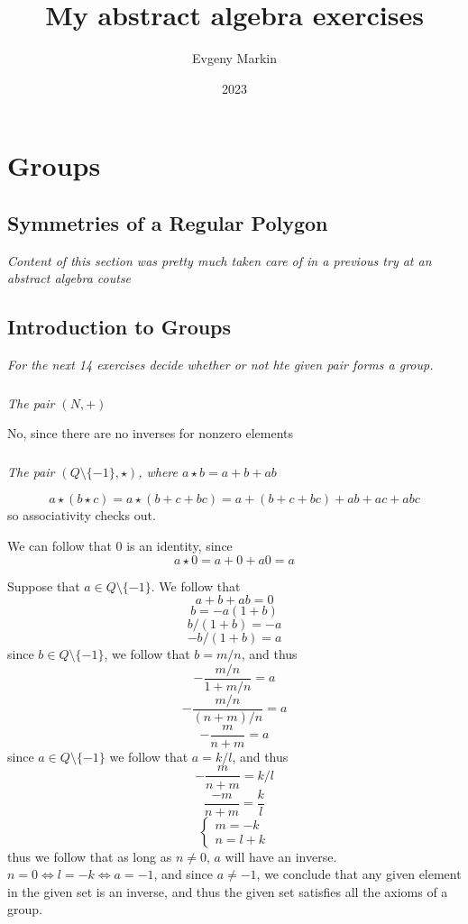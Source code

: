 \documentclass[11pt,oneside,titlepage]{book}
\title{My abstract algebra exercises}
\author{Evgeny Markin}
\date{2023}
\newcommand{\set}[1]{\{ #1 \}}
\begin{document}
\maketitle
\tableofcontents

\chapter{Groups}

\section{Symmetries of  a Regular Polygon}

\textit{Content of this section was pretty much taken care of in a previous try at an
  abstract algebra coutse}

\section{Introduction to Groups}

\textit{For the next 14 exercises decide whether or not hte given pair forms a group.}

\subsection{}

\textit{The pair $(N, +)$}

No, since there are no inverses for nonzero elements

\subsection{}

\textit{The pair $(Q \setminus \set{-1}, \star)$, where $a \star b = a + b + ab$}

$$a \star (b \star c) = a \star (b + c + bc) = a + (b + c + bc) + ab + ac + abc$$
so associativity checks out.

We can follow that $0$ is an identity, since
$$a \star 0 = a + 0 + a0 = a$$

Suppose that $a \in Q \setminus \set{-1}$. We follow that
$$a + b + ab = 0$$
$$b = -a(1 + b)$$
$$b/(1 + b) = -a$$
$$- b/(1 + b) = a$$
since $b \in Q \setminus \set{-1}$, we follow that $b = m/n$, and thus
$$- \frac{m/n}{1 + m/n} = a$$
$$- \frac{m/n}{(n + m)/n} = a$$
$$- \frac{m}{n + m} = a$$
since $a \in Q \setminus \set{-1}$ we follow that $a = k/l$, and thus
$$- \frac{m}{n + m} = k/l$$
$$\frac{- m}{n + m} = \frac{k}{l}$$
$$
\begin{cases}
  m = -k \\
  n = l + k
\end{cases}
$$
thus we follow that as long as $n \neq 0$, $a$ will have an inverse. $n = 0 \iff l = -k \iff a = -1$,
and since $a \neq -1$, we conclude that any given element in the given set is an inverse, and thus
the given set satisfies all the axioms of a group.
\end{document}
